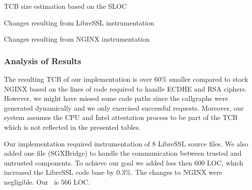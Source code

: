 \documentclass[../../../main.tex]{subfiles}
\begin{document}
\begin{table}[H]
  \center
  \footnotesize
  \caption{TCB size estimation based on the SLOC}
  \label{tab:tcb-estimate}
\end{table}

\begin{table}[H]
  \caption{Changes resulting from LibreSSL instrumentation}
  \label{tab:libressl-diff}
\end{table}

\begin{table}[H]
  \caption{Changes resulting from NGINX instrumentation}
  \label{tab:nginx-diff}
\end{table}

\subsubsection*{Analysis of Results}
The resulting TCB of our implementation is over 60\% smaller compared to stock
NGINX based on the lines of code required to handle ECDHE and RSA ciphers.
However, we might have missed some code paths since the callgraphs were
generated dynamically and we only exercised successful requests. Moreover, our
system assumes the CPU and Intel attestation process to be part of the TCB
which is not reflected in the presented tables.

Our implementation required instrumentation of 8 LibreSSL source files. We also
added one file (SGXBridge) to handle the communication between trusted and
untrusted components. To achieve our goal we added less then 600 LOC, which
increased the LibreSSL code base by 0.3\%. The changes to NGINX were
negligible. Our \enclaveprogram~is 566 LOC.
\end{document}
